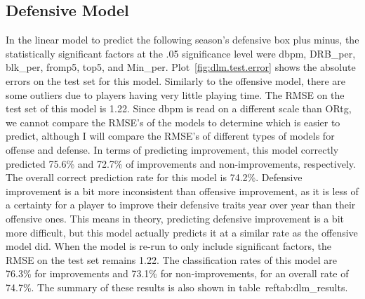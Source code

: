 \documentclass[12pt]{article}
\begin{document}
\begin{table}[]
\centering
{}
\caption{Offensive Linear Model Evaluators}
\label{tab:olm_results}
\end{table}

\subsection{Defensive Model}
\label{subsec:dlm}
In the linear model to predict the following season's defensive box plus minus, the statistically significant factors at the .05 significance level were dbpm, DRB\_per, blk\_per, fromp5, top5, and Min\_per. Plot~\ref{fig:dlm.test.error} shows the absolute errors on the test set for this model. Similarly to the offensive model, there are some outliers due to players having very little playing time. The RMSE on the test set of this model is 1.22. Since dbpm is read on a different scale than ORtg, we cannot compare the RMSE's of the models to determine which is easier to predict, although I will compare the RMSE's of different types of models for offense and defense. In terms of predicting improvement, this model correctly predicted 75.6\% and 72.7\% of improvements and non-improvements, respectively. The overall correct prediction rate for this model is 74.2\%. Defensive improvement is a bit more inconsistent than offensive improvement, as it is less of a certainty for a player to improve their defensive traits year over year than their offensive ones. This means in theory, predicting defensive improvement is a bit more difficult, but this model actually predicts it at a similar rate as the offensive model did. When the model is re-run to only include significant factors, the RMSE on the test set remains 1.22. The classification rates of this model are 76.3\% for improvements and 73.1\% for non-improvements, for an overall rate of 74.7\%. The summary of these results is also shown in table~ref{tab:dlm_results}.
\end{document}
